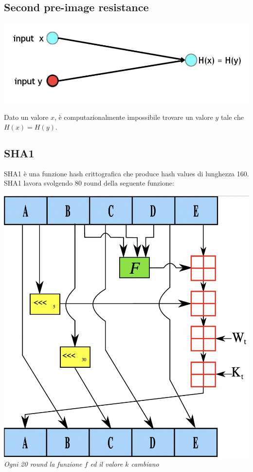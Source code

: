 \documentclass[11pt, oneside]{article}   	%
\begin{document}
\subsection*{Second pre-image resistance}
\begin{center}
\includegraphics[scale= 0.5]{h3}
\end{center}
Dato un valore $x$, è computazionalmente impossibile trovare un valore $y$ tale che $H(x) = H(y)$.

\subsection*{SHA1}
SHA1 è una funzione hash crittografica che produce hash values di lunghezza 160. SHA1 lavora svolgendo 80 round della seguente funzione:
\begin{center}
\includegraphics[scale= 0.5]{sh1}\\
\emph{Ogni 20 round la funzione $f$ ed il valore $k$ cambiano}
\end{center}
\end{document}
